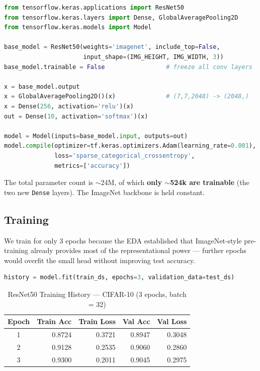 \begin{lstlisting}[language=Python,caption={ResNet50 transfer-learning model.}]
from tensorflow.keras.applications import ResNet50
from tensorflow.keras.layers import Dense, GlobalAveragePooling2D
from tensorflow.keras.models import Model

base_model = ResNet50(weights='imagenet', include_top=False,
                      input_shape=(IMG_HEIGHT, IMG_WIDTH, 3))
base_model.trainable = False                 # freeze all conv layers

x = base_model.output
x = GlobalAveragePooling2D()(x)              # (7,7,2048) -> (2048,)
x = Dense(256, activation='relu')(x)
out = Dense(10, activation='softmax')(x)

model = Model(inputs=base_model.input, outputs=out)
model.compile(optimizer=tf.keras.optimizers.Adam(learning_rate=0.001),
              loss='sparse_categorical_crossentropy',
              metrics=['accuracy'])
\end{lstlisting}

The total parameter count is $\sim$24M, of which \textbf{only $\sim$524k are trainable} (the two new \texttt{Dense} layers). The ImageNet backbone is held constant.

\subsection{Training}

We train for only 3 epochs because the EDA established that ImageNet-style pre-training already provides most of the representational power --- further epochs would overfit the small head without improving test accuracy.

\begin{lstlisting}[language=Python]
history = model.fit(train_ds, epochs=3, validation_data=test_ds)
\end{lstlisting}

\begin{table}[H]
\centering
\caption{ResNet50 Training History --- CIFAR-10 (3 epochs, batch = 32)}
\label{tab:a2_img_history}
\begin{tabular}{crrrr}
\hline
\textbf{Epoch} & \textbf{Train Acc} & \textbf{Train Loss} & \textbf{Val Acc} & \textbf{Val Loss} \\
\hline
1 & 0.8724 & 0.3721 & 0.8947 & 0.3048 \\
2 & 0.9128 & 0.2535 & 0.9060 & 0.2860 \\
3 & 0.9300 & 0.2011 & 0.9045 & 0.2975 \\
\hline
\end{tabular}
\end{table}

